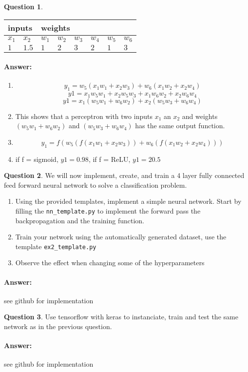 \documentclass[11pt,a4paper]{article}
\theoremstyle{definition}%
\newtheorem{Q}{Question}[] %
\newcommand{\reponse}[1]{%
\ifthenelse {\boolean{corrige}} {\paragraph{Answer:} \color{darkblue}   #1\color{black}} {}
}
\begin{document}
\begin{Q}
\begin{enumerate}
    \begin{center}
    \begin{tabular}{|l|l|l|l|l|l|l|l|}
    \hline
    \multicolumn{2}{|l|}{inputs} & \multicolumn{6}{l|}{weights}                  \\ \hline
    $x_1$         & $x_2$        & $w_1$ & $w_2$ & $w_3$ & $w_4$ & $w_5$ & $w_6$ \\ \hline
    $1$           & $1.5$        & $1$   & $2$   & $3$   & $2$   & $1$   & $3$   \\ \hline
    \end{tabular}
    \end{center}

\end{enumerate}

\reponse{

\begin{enumerate}
    \item $$y_1 = w_5 ( x_1 w_1 + x_2 w_3 ) + w_6 ( x_1 w_2 + x_2 w_4 )$$
        $$y1 = x_1 w_5 w_1 + x_2 w_5 w_3 + x_1 w_6 w_2 + x_2 w_6 w_4$$
        $$y1 = x_1 (w_5 w_1 + w_6 w_2) + x_2 (w_5 w_3 + w_6 w_4)  $$
    \item This shows that a perceptron with two inputs $x_1$ an $x_2$ and weights 
        $(w_5 w_1 + w_6 w_2)$ and $(w_5 w_3 + w_6 w_4)$ has the same output function.
    \item $$y_1 = f(w_5 ( f(x_1 w_1 + x_2 w_3 )) + w_6 ( f(x_1 w_2 + x_2 w_4 )))$$
    \item if f = sigmoid, $y1 = 0.98$, if f = ReLU, $y1 = 20.5$

\end{enumerate}

}

\end{Q}

\begin{Q}
    We will now implement, create, and train a 4 layer fully connected feed forward neural network
    to solve a classification problem.
    \begin{enumerate}
        \item Using the provided templates, implement a simple neural network.
            Start by filling the \verb!nn_template.py! to implement the forward pass
            the backpropagation and the training function.
        \item Train your network using the automatically generated dataset, use the template \verb!ex2_template.py!
        \item Observe the effect when changing some of the hyperparameters 
    \end{enumerate}
    \reponse{
        see github for implementation
    }
\end{Q}

\begin{Q}
    Use tensorflow with keras to instanciate, train and test the same network as in the
    previous question.

    \reponse{
        see github for implementation
    }
\end{Q}
\end{document}
